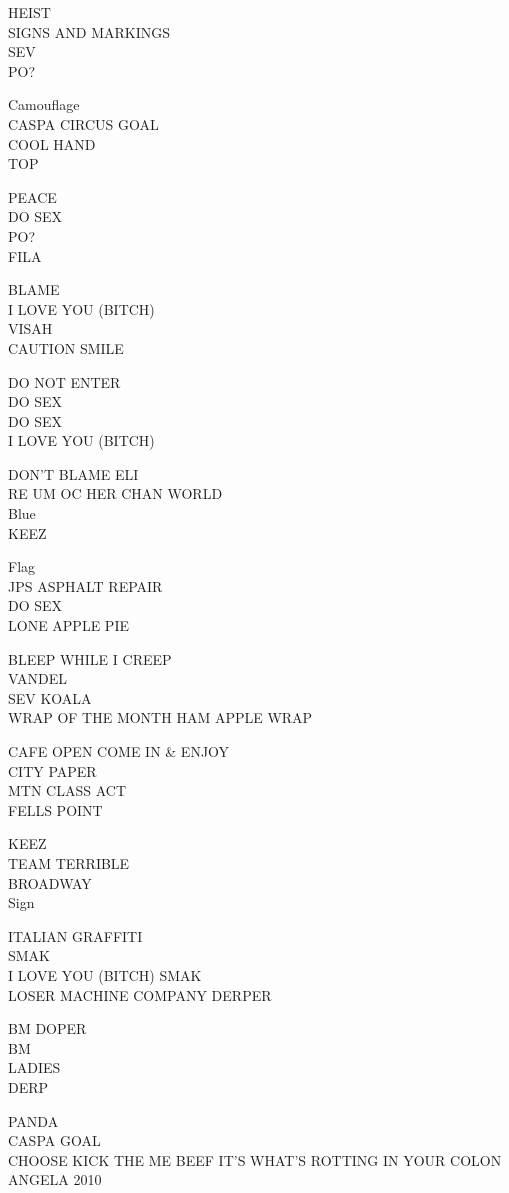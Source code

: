 \documentclass[10pt,letterpaper]{article}
\begin{document}
HEIST\\
SIGNS AND MARKINGS\\
SEV\\
PO?

Camouflage\\
CASPA CIRCUS GOAL\\
COOL HAND\\
TOP

PEACE\\
DO SEX\\
PO?\\
FILA

BLAME\\
I LOVE YOU (BITCH)\\
VISAH\\
CAUTION SMILE

DO NOT ENTER\\
DO SEX\\
DO SEX\\
I LOVE YOU (BITCH)

DON'T BLAME ELI\\
RE UM OC HER CHAN WORLD\\
Blue\\
KEEZ

Flag\\
JPS ASPHALT REPAIR\\
DO SEX\\
LONE APPLE PIE

BLEEP WHILE I CREEP\\
VANDEL\\
SEV KOALA\\
WRAP OF THE MONTH HAM APPLE WRAP

CAFE OPEN COME IN \& ENJOY\\
CITY PAPER\\
MTN CLASS ACT\\
FELLS POINT

KEEZ\\
TEAM TERRIBLE\\
BROADWAY\\
Sign

ITALIAN GRAFFITI\\
SMAK\\
I LOVE YOU (BITCH) SMAK\\
LOSER MACHINE COMPANY DERPER

BM DOPER\\
BM\\
LADIES\\
DERP

PANDA\\
CASPA GOAL\\
CHOOSE KICK THE ME BEEF IT'S WHAT'S ROTTING IN YOUR COLON\\
ANGELA 2010
\end{document}

